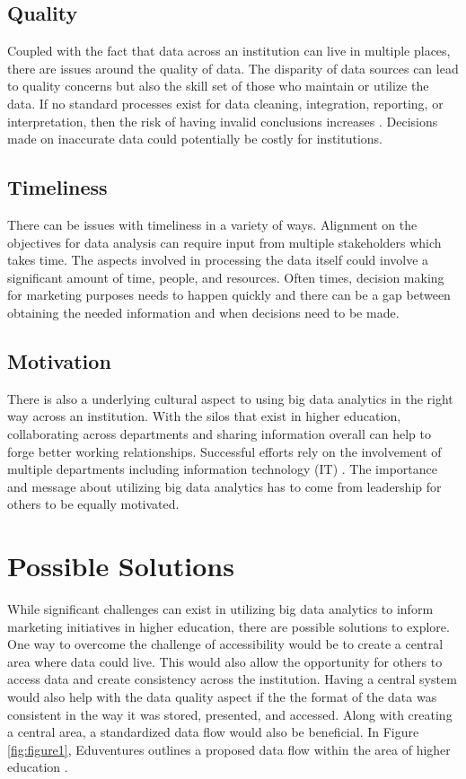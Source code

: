\documentclass[sigconf]{acmart}
\begin{document}
\subsection{Quality}
Coupled with the fact that data across an institution can live in multiple places, there are issues around the quality of data. The disparity of data sources can lead to quality concerns but also the skill set of those who maintain or utilize the data. If no standard processes exist for data cleaning, integration, reporting, or interpretation, then the risk of having invalid conclusions increases \cite{Marsh2006}. Decisions made on inaccurate data could potentially be costly for institutions. 

\subsection{Timeliness}
There can be issues with timeliness in a variety of ways. Alignment on the objectives for data analysis can require input from multiple stakeholders which takes time. The aspects involved in processing the data itself could involve a significant amount of time, people, and resources. Often times, decision making for marketing purposes needs to happen quickly and there can be a gap between obtaining the needed information and when decisions need to be made. 

\subsection{Motivation}
There is also a underlying cultural aspect to using big data analytics in the right way across an institution. With the silos that exist in higher education, collaborating across departments and sharing information overall can help to forge better working relationships. Successful efforts rely on the involvement of multiple departments including information technology (IT) \cite{Daniel2015}. The importance and message about utilizing big data analytics has to come from leadership for others to be equally motivated. 

\section{Possible Solutions}

While significant challenges can exist in utilizing big data analytics to inform marketing initiatives in higher education, there are possible solutions to explore. One way to overcome the challenge of accessibility would be to create a central area where data could live. This would also allow the opportunity for others to access data and create consistency across the institution. Having a central system would also help with the data quality aspect if the the format of the data was consistent in the way it was stored, presented, and accessed. Along with creating a central area, a standardized data flow would also be beneficial. In Figure \ref{fig:figure1}, Eduventures outlines a proposed data flow within the area of higher education \cite{Wiley2016}. 
\end{document}

